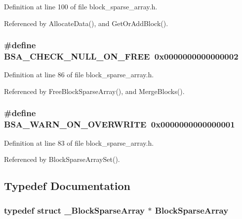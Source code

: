 Definition at line 100 of file block\_\-sparse\_\-array.h.

Referenced by Allocate\-Data(), and Get\-Or\-Add\-Block().
\subsubsection{\setlength{\rightskip}{0pt plus 5cm}\#define BSA\_\-CHECK\_\-NULL\_\-ON\_\-FREE~0x0000000000000002}\label{block__sparse__array_8h_a08e46096e6f2c4db3aa81e9b7ec9e36}




Definition at line 86 of file block\_\-sparse\_\-array.h.

Referenced by Free\-Block\-Sparse\-Array(), and Merge\-Blocks().
\subsubsection{\setlength{\rightskip}{0pt plus 5cm}\#define BSA\_\-WARN\_\-ON\_\-OVERWRITE~0x0000000000000001}\label{block__sparse__array_8h_37721de4c719011530f959c6c3ee3a18}




Definition at line 83 of file block\_\-sparse\_\-array.h.

Referenced by Block\-Sparse\-Array\-Set().

\subsection{Typedef Documentation}
\subsubsection{\setlength{\rightskip}{0pt plus 5cm}typedef struct \bf{\_\-Block\-Sparse\-Array} $\ast$ \bf{Block\-Sparse\-Array}}\label{block__sparse__array_8h_724cb68321a9b3e0cc366108c6839132}




